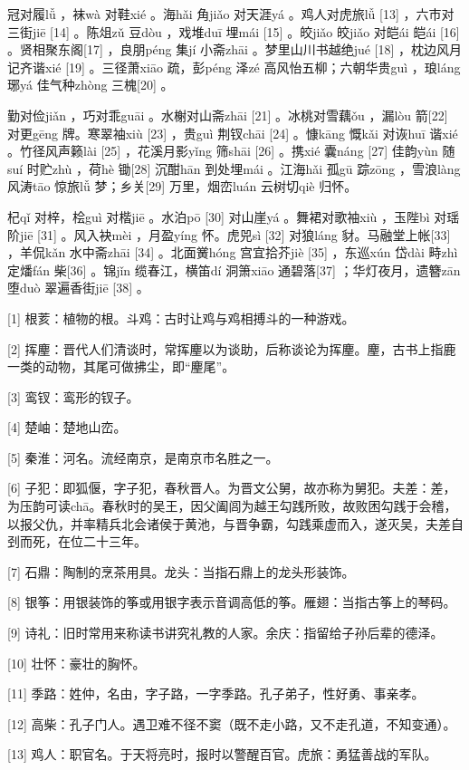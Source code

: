 \documentclass[12pt,UTF8]{ctexbook}
\begin{document}
冠对履lǚ ，袜wà 对鞋xié 。海hǎi 角jiǎo 对天涯yá 。鸡人对虎旅lǚ [13] ，六市对三街jiē [14] 。陈俎zǔ 豆dòu ，戏堆duī 埋mái [15] 。皎jiǎo 皎jiǎo 对皑ái 皑ái [16] 。贤相聚东阁[17] ，良朋péng 集jí 小斋zhāi 。梦里山川书越绝jué [18] ，枕边风月记齐谐xié [19] 。三径萧xiāo 疏，彭péng 泽zé 高风怡五柳；六朝华贵guì ，琅láng 琊yá 佳气种zhòng 三槐[20] 。

勤对俭jiǎn ，巧对乖guāi 。水榭对山斋zhāi [21] 。冰桃对雪藕ǒu ，漏lòu 箭[22] 对更gēng 牌。寒翠袖xiù [23] ，贵guì 荆钗chāi [24] 。慷kāng 慨kǎi 对诙huī 谐xié 。竹径风声籁lài [25] ，花溪月影yǐng 筛shāi [26] 。携xié 囊náng [27] 佳韵yùn 随suí 时贮zhù ，荷hè 锄[28] 沉酣hān 到处埋mái 。江海hǎi 孤gū 踪zōng ，雪浪làng 风涛tāo 惊旅lǚ 梦；乡关[29] 万里，烟峦luán 云树切qiè 归怀。

杞qǐ 对梓，桧guì 对楷jiē 。水泊pō [30] 对山崖yá 。舞裙对歌袖xiù ，玉陛bì 对瑶阶jiē [31] 。风入袂mèi ，月盈yíng 怀。虎兕sì [32] 对狼láng 豺。马融堂上帐[33] ，羊侃kǎn 水中斋zhāi [34] 。北面黉hóng 宫宜拾芥jiè [35] ，东巡xún 岱dài 畤zhì 定燔fán 柴[36] 。锦jǐn 缆春江，横笛dí 洞箫xiāo 通碧落[37] ；华灯夜月，遗簪zān 堕duò 翠遍香街jiē [38] 。


[1] 根荄：植物的根。斗鸡：古时让鸡与鸡相搏斗的一种游戏。

[2] 挥麈：晋代人们清谈时，常挥麈以为谈助，后称谈论为挥麈。麈，古书上指鹿一类的动物，其尾可做拂尘，即“麈尾”。

[3] 鸾钗：鸾形的钗子。

[4] 楚岫：楚地山峦。

[5] 秦淮：河名。流经南京，是南京市名胜之一。

[6] 子犯：即狐偃，字子犯，春秋晋人。为晋文公舅，故亦称为舅犯。夫差：差，为压韵可读chā。春秋时的吴王，因父阖闾为越王勾践所败，故败困勾践于会稽，以报父仇，并率精兵北会诸侯于黄池，与晋争霸，勾践乘虚而入，遂灭吴，夫差自刭而死，在位二十三年。

[7] 石鼎：陶制的烹茶用具。龙头：当指石鼎上的龙头形装饰。

[8] 银筝：用银装饰的筝或用银字表示音调高低的筝。雁翅：当指古筝上的琴码。

[9] 诗礼：旧时常用来称读书讲究礼教的人家。余庆：指留给子孙后辈的德泽。

[10] 壮怀：豪壮的胸怀。

[11] 季路：姓仲，名由，字子路，一字季路。孔子弟子，性好勇、事亲孝。

[12] 高柴：孔子门人。遇卫难不径不窦（既不走小路，又不走孔道，不知变通）。

[13] 鸡人：职官名。于天将亮时，报时以警醒百官。虎旅：勇猛善战的军队。
\end{document}
